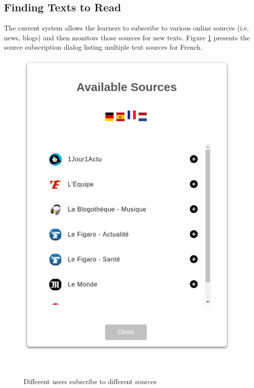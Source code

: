 


  
\newpage
\subsection{Finding Texts to Read}
The current system allows the learners to subscribe to various online sources (i.e. news, blogs) and then monitors those sources for new texts. Figure \ref{fig:system_subscriptions} presents the source subscription dialog listing multiple text sources for French.



    \begin{figure}[h!]
    \centering
      \includegraphics[width=0.4\columnwidth]{figures/available_sources}
      \caption{Different users subscribe to different sources}~\label{fig:system_subscriptions}
    \end{figure}

